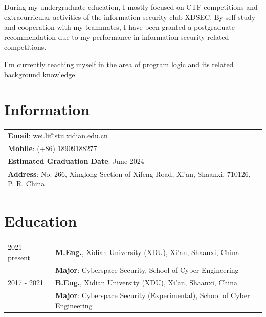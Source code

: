 \documentclass[a4paper,12pt]{article}
\begin{document}
During my undergraduate education, I mostly focused on CTF competitions and extracurricular activities of the information security club XDSEC. By self-study and cooperation with my teammates, I have been granted a postgraduate recommendation due to my performance in information security-related competitions.

I’m currently teaching myself in the area of program logic and its related background knowledge.


\section{Information}

\begin{tabularx}{\linewidth}{ @{}l }
\textbf{Email}: {wei.li@stu.xidian.edu.cn}\\
\textbf{Mobile}: {(+86) 18909188277}\\
\textbf{Estimated Graduation Date}: {June 2024}\\
\textbf{Address}: {No. 266, Xinglong Section of Xifeng Road, Xi’an, Shaanxi, 710126, P. R. China}\\

\end{tabularx}

\section{Education}
\begin{tabularx}{\linewidth}{@{}l X@{}}	

2021 - present & \textbf{M.Eng.}, Xidian University (XDU),  Xi’an, Shaanxi, China \\ 
    & \textbf{Major}: Cyberspace Security, School of Cyber Engineering \\
2017 - 2021 & \textbf{B.Eng.}, Xidian University (XDU),  Xi’an, Shaanxi, China \\ 
    & \textbf{Major}: Cyberspace Security (Experimental), School of Cyber Engineering \\


\end{tabularx}
\end{document}
